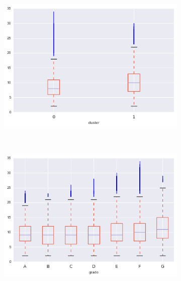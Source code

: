 \begin{apendicesenv}
\begin{figure}[t!]
\begin{subfigure}[t]{0.5\textwidth}
			\centerline{\includegraphics[width=1\textwidth]{img/open_acc_by_cluster}}
    	\end{subfigure}%
    	~ 
    	\begin{subfigure}[t]{0.5\textwidth}
    		\centering
   
			\centerline{\includegraphics[width=1\textwidth]{img/open_acc_by_grade}}

    	\end{subfigure}
    	\\
    	        \caption{pub\textunderscore rec}
    	\begin{subfigure}[t]{0.5\textwidth}
    		\centering


\end{subfigure}
\end{figure}
\end{apendicesenv}
